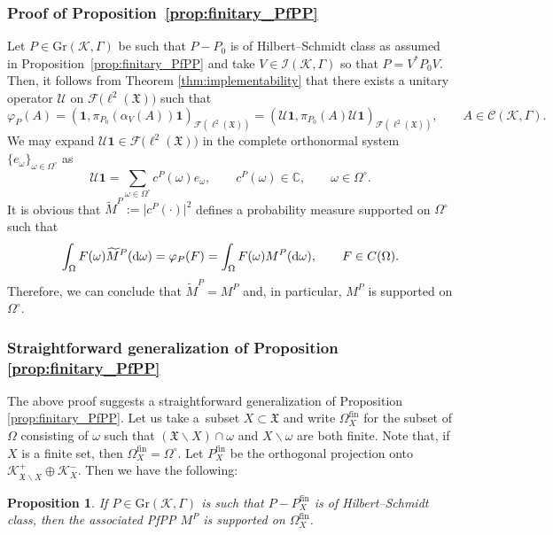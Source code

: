 \documentclass[pdftex]{sigma}
\numberwithin{equation}{section}
\newtheorem{Proposition}[Theorem]{Proposition}
 { \theoremstyle{definition}
\newtheorem{Definition}[Theorem]{Definition}
\newtheorem{Example}[Theorem]{Example}
\newtheorem{Remark}[Theorem]{Remark} }
\newcommand{\mfrak}[1]{\mathfrak{#1}}
\newcommand{\mcal}[1]{\mathcal{#1}}
\newcommand{\mbb}[1]{\mathbb{#1}}
\newcommand{\mrm}[1]{\mathrm{#1}}
\begin{document}
\subsubsection{Proof of Proposition~\ref{prop:finitary_PfPP}}
Let $P\in \mrm{Gr}(\mcal{K},\Gamma)$ be such that $P-P_{0}$ is of Hilbert--Schmidt class as assumed in Proposition~\ref{prop:finitary_PfPP}
and take $V\in \mcal{I}(\mcal{K},\Gamma)$ so that $P=V^{\ast}P_{0}V$.
Then, it follows from Theorem \ref{thm:implementability} that there exists a unitary operator $\mcal{U}$ on $\mcal{F}\big(\ell^{2}(\mfrak{X})\big)$ such that
\begin{equation*}
	\varphi_{P}(A)=(\bm{1},\pi_{P_{0}}(\alpha_{V}(A))\bm{1})_{\mcal{F}(\ell^{2}(\mfrak{X}))} =(\mcal{U}\bm{1},\pi_{P_{0}}(A)\mcal{U}\bm{1})_{\mcal{F}(\ell^{2}(\mfrak{X}))},\qquad A\in \mcal{C}(\mcal{K},\Gamma).
\end{equation*}
We may expand $\mcal{U}\bm{1}\in\mcal{F}\big(\ell^{2}(\mfrak{X})\big)$ in the complete orthonormal system $\{e_{\omega}\}_{\omega\in\Omega^{\circ}}$ as
\begin{equation*}
	\mcal{U}\bm{1}=\sum_{\omega\in\Omega^{\circ}} c^{P}(\omega)e_{\omega},\qquad c^{P}(\omega)\in\mbb{C},\qquad \omega\in\Omega^{\circ}.
\end{equation*}
It is obvious that $\widetilde{M}^{P}:=\big|c^{P}(\cdot)\big|^{2}$ defines a probability measure supported on $\Omega^{\circ}$ such that
\begin{equation*}
	\int_{\Omega}F(\omega)\widetilde{M}^{P}({\rm d}\omega)=\varphi_{P}(F)=\int_{\Omega}F(\omega)M^{P}({\rm d}\omega),\qquad F\in C(\Omega).
\end{equation*}
Therefore, we can conclude that $\widetilde{M}^{P}=M^{P}$ and, in particular, $M^{P}$ is supported on $\Omega^{\circ}$.

\subsubsection{Straightforward generalization of Proposition \ref{prop:finitary_PfPP}}
The above proof suggests a straightforward generalization of Proposition \ref{prop:finitary_PfPP}.
Let us take a~subset $X\subset\mfrak{X}$ and write $\Omega_{X}^{\mrm{fin}}$ for the subset of $\Omega$ consisting of $\omega$ such that $(\mfrak{X}\backslash X)\cap \omega$ and $X\backslash\omega$ are both finite. Note that, if $X$ is a finite set, then $\Omega_{X}^{\mrm{fin}}=\Omega^{\circ}$. Let $P_{X}^{\mrm{fin}}$ be the orthogonal projection onto $\mcal{K}^{+}_{\mfrak{X}\backslash X}\oplus \mcal{K}^{-}_{X}$.
Then we have the following:
\begin{Proposition}
\label{prop:finitary_PfPP_generalization}
If $P\in \mrm{Gr}(\mcal{K},\Gamma)$ is such that $P-P_{X}^{\mrm{fin}}$ is of Hilbert--Schmidt class, then the associated PfPP $M^{P}$ is supported on $\Omega_{X}^{\mrm{fin}}$.
\end{Proposition}
\end{document}
